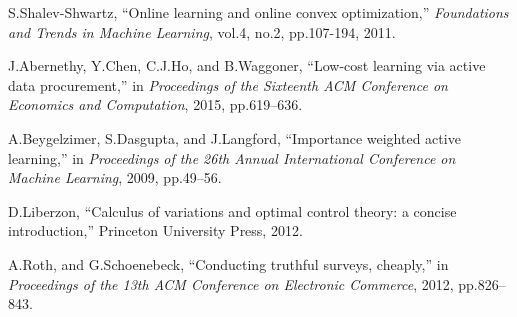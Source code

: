 \documentclass[10pt,conference,compsocconf,letterpaper]{IEEEtran}
\begin{document}
\begin{thebibliography}{99}
S.Shalev-Shwartz, ``Online learning and online convex optimization,'' \emph{Foundations and Trends in Machine Learning}, vol.4, no.2, pp.107-194, 2011.

J.Abernethy, Y.Chen, C.J.Ho, and B.Waggoner, ``Low-cost learning via active data procurement,'' in \emph{Proceedings of the Sixteenth ACM Conference on Economics and Computation}, 2015, pp.619--636.

A.Beygelzimer, S.Dasgupta, and J.Langford, ``Importance weighted active learning,'' in \emph{Proceedings of the 26th Annual International Conference on Machine Learning}, 2009, pp.49--56.

D.Liberzon, ``Calculus of variations and optimal control theory: a concise introduction,'' Princeton University Press, 2012.

A.Roth, and G.Schoenebeck, ``Conducting truthful surveys, cheaply,'' in \emph{Proceedings of the 13th ACM Conference on Electronic Commerce}, 2012, pp.826--843.


\end{thebibliography}
\end{document}
